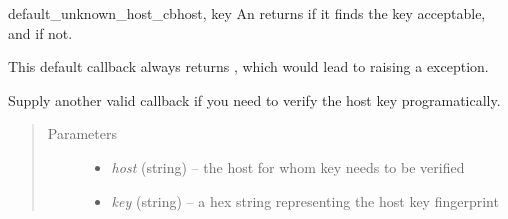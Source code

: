 \documentclass[a4paper,10pt,english]{manual}
\begin{document}
\hypertarget{ncclient.transport.ssh.default_unknown_host_cb}{}\begin{staticmethoddesc}[ssh]{default\_unknown\_host\_cb}{host, key}
An  returns \href{http://docs.python.org/library/constants.html\#True}{} if it finds the key
acceptable, and \href{http://docs.python.org/library/constants.html\#False}{} if not.

This default callback always returns \href{http://docs.python.org/library/constants.html\#False}{}, which would lead to
 raising a  exception.

Supply another valid callback if you need to verify the host key
programatically.
\begin{quote}\begin{description}
\item[Parameters]\begin{itemize}
\item {} 
\emph{host} (string) -- the host for whom key needs to be verified

\item {} 
\emph{key} (string) -- a hex string representing the host key fingerprint

\end{itemize}

\end{description}\end{quote}
\end{staticmethoddesc}
\end{document}
